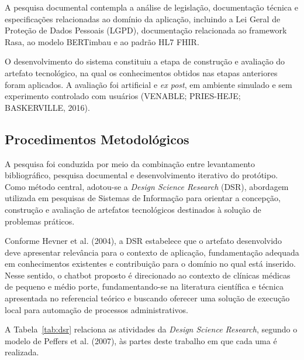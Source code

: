 \documentclass[12pt,a4paper]{extarticle}
\begin{document}
A pesquisa documental contempla a análise de legislação, documentação técnica e especificações relacionadas ao domínio da aplicação, incluindo a Lei Geral de Proteção de Dados Pessoais (LGPD), documentação relacionada ao framework Rasa, ao modelo BERTimbau e ao padrão HL7 FHIR.

O desenvolvimento do sistema constituiu a etapa de construção e avaliação do artefato tecnológico, na qual os conhecimentos obtidos nas etapas anteriores foram aplicados. A avaliação foi artificial e \textit{ex post}, em ambiente simulado e sem experimento controlado com usuários (VENABLE; PRIES-HEJE; BASKERVILLE, 2016).

\subsection{Procedimentos Metodológicos}
\label{sec:procedimentos}

A pesquisa foi conduzida por meio da combinação entre levantamento bibliográfico, pesquisa documental e desenvolvimento iterativo do protótipo. Como método central, adotou-se a \textit{Design Science Research} (DSR), abordagem utilizada em pesquisas de Sistemas de Informação para orientar a concepção, construção e avaliação de artefatos tecnológicos destinados à solução de problemas práticos.

Conforme Hevner et al. (2004), a DSR estabelece que o artefato desenvolvido deve apresentar relevância para o contexto de aplicação, fundamentação adequada em conhecimentos existentes e contribuição para o domínio no qual está inserido. Nesse sentido, o chatbot proposto é direcionado ao contexto de clínicas médicas de pequeno e médio porte, fundamentando-se na literatura científica e técnica apresentada no referencial teórico e buscando oferecer uma solução de execução local para automação de processos administrativos.

A Tabela~\ref{tab:dsr} relaciona as atividades da \textit{Design Science Research}, segundo o modelo de Peffers et al. (2007), às partes deste trabalho em que cada uma é realizada.
\end{document}
